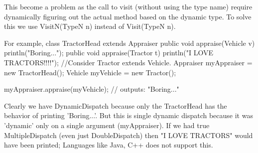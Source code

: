 {{\begin{solution}[2in]
  This become a problem as the call to visit (without using the type
  name) require dynamically figuring out the actual method based on
  the dynamic type.  To solve this we use VisitN(TypeN n) instead of
  Visit(TypeN n).

  For example,
   class TractorHead extends Appraiser {
    public void appraise(Vehicle v) { println("Boring...");           }
    public void appraise(Tractor t) { println("I LOVE TRACTORS!!!!"); }
  }
  //Consider Tractor extends Vehicle.
  Appraiser myAppraiser = new TractorHead();
  Vehicle   myVehicle   = new Tractor();

  myAppraiser.appraise(myVehicle);        // outputs: "Boring..."

  Clearly we have DynamicDispatch because only the TractorHead has the behavior
  of printing 'Boring...'. But this is single dynamic dispatch because it was
  'dynamic' only on a single argument (myAppraiser). If we had true
  MultipleDispatch (even just DoubleDispatch) then "I LOVE TRACTORS" would have
  been printed; Languages like Java, C++ does not support this.  
\end{solution}
}



}
